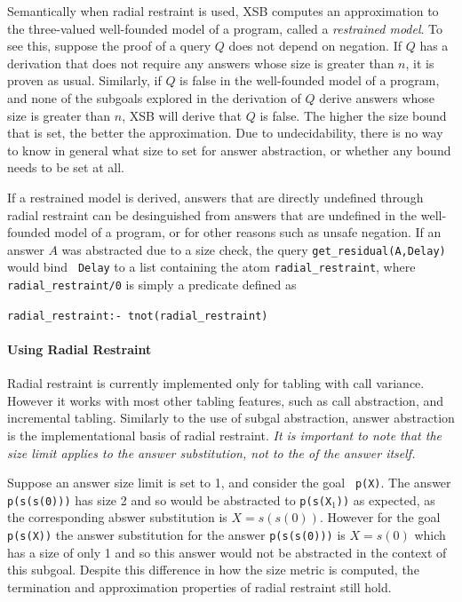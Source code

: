 Semantically when radial restraint is used, XSB computes an
approximation to the three-valued well-founded model of a program,
called a {\em restrained model}.  To see this, suppose the proof of a
query $Q$ does not depend on negation.  If $Q$ has a derivation that
does not require any answers whose size is greater than $n$, it is
proven as usual.  Similarly, if $Q$ is false in the well-founded model
of a program, and none of the subgoals explored in the derivation of
$Q$ derive answers whose size is greater than $n$, XSB will derive
that $Q$ is false.  The higher the size bound that is set, the better
the approximation.  Due to undecidability, there is no way to know in
general what size to set for answer abstraction, or whether any bound
needs to be set at all.

If a restrained model is derived, answers that are directly undefined
through radial restraint can be desinguished from answers that are
undefined in the well-founded model of a program, or for other reasons
such as unsafe negation.  If an answer $A$ was abstracted due to a
size check, the query {\tt get\_residual(A,Delay)} would bind {\tt
  Delay} to a list containing the atom {\tt radial\_restraint}, where
{\tt radial\_restraint/0} is simply a predicate defined as

{\tt radial\_restraint:- tnot(radial\_restraint)}


\paragraph*{Using Radial Restraint}
%
Radial restraint is currently implemented only for tabling with call
variance.  However it works with most other tabling features, such as
call abstraction, and incremental tabling.
%
Similarly to the use of subgal abstraction, answer abstraction is the
implementational basis of radial restraint.  {\em It is important to note
that the size limit applies to the answer substitution, not to the 
of the answer itself.}

\begin{example}
Suppose an answer size limit is set to 1, and consider the goal {\tt
  p(X)}.  The answer {\tt p(s(s(0)))} has size 2 and so would be
abstracted to {\tt p(s(X$_1$))} as expected, as the corresponding
abswer substitution is $X = s(s(0))$.  However for the goal {\tt
  p(s(X))} the answer substitution for the answer {\tt p(s(s(0)))} is
$X = s(0)$ which has a size of only 1 and so this answer would not be
abstracted in the context of this subgoal.  Despite this difference in
how the size metric is computed, the termination and approximation
properties of radial restraint still hold.
\end{example}

